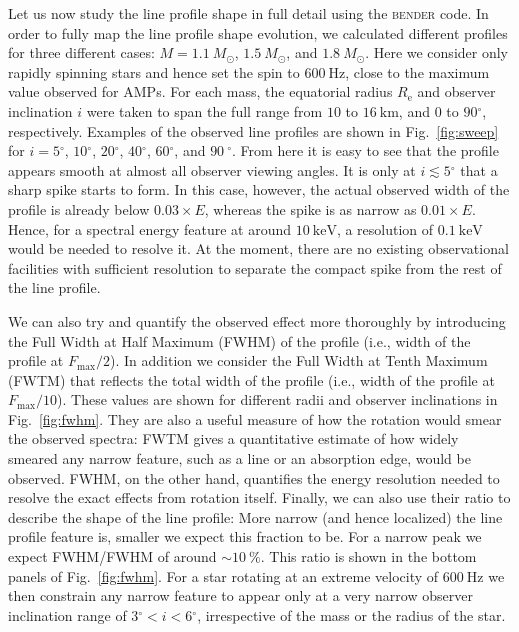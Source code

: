 \documentclass{aa}
\newcommand{\Msun}{\ensuremath{M_{\odot}}}
\renewcommand{\deg}{\ensuremath{^{\circ}}}
\begin{document}
Let us now study the line profile shape in full detail using the \textsc{bender} code.
In order to fully map the line profile shape evolution, we calculated different profiles for three different cases: $M=1.1~\Msun$, $1.5~\Msun$, and $1.8~\Msun$.
Here we consider only rapidly spinning stars and hence set the spin to $600~\mathrm{Hz}$, close to the maximum value observed for AMPs.
For each mass, the equatorial radius $R_{\mathrm{e}}$ and observer inclination $i$ were taken to span the full range from $10$ to $16~\mathrm{km}$, and $0$ to $90\deg$, respectively.
Examples of the observed line profiles are shown in Fig.~\ref{fig:sweep} for $i=5\deg$, $10\deg$, $20\deg$, $40\deg$, $60\deg$, and $90~\deg$.
From here it is easy to see that the profile appears smooth at almost all observer viewing angles.
It is only at $i \lesssim 5\deg$ that a sharp spike starts to form.
In this case, however, the actual observed width of the profile is already below $0.03 \times E$, whereas the spike is as narrow as $0.01 \times E$.
Hence, for a spectral energy feature at around $10~\mathrm{keV}$, a resolution of $0.1~\mathrm{keV}$ would be needed to resolve it.
At the moment, there are no existing observational facilities with sufficient resolution to separate the compact spike from the rest of the line profile.

We can also try and quantify the observed effect more thoroughly by introducing the Full Width at Half Maximum (FWHM) of the profile (i.e., width of the profile at $F_{\mathrm{max}}/2$).
In addition we consider the Full Width at Tenth Maximum (FWTM) that reflects the total width of the profile (i.e., width of the profile at $F_{\mathrm{max}}/10$).
These values are shown for different radii and observer inclinations in Fig.~\ref{fig:fwhm}.
They are also a useful measure of how the rotation would smear the observed spectra:
FWTM gives a quantitative estimate of how widely smeared any narrow feature, such as a line or an absorption edge, would be observed.
FWHM, on the other hand, quantifies the energy resolution needed to resolve the exact effects from rotation itself.
Finally, we can also use their ratio to describe the shape of the line profile:
More narrow (and hence localized) the line profile feature is, smaller we expect this fraction to be.
For a narrow peak we expect FWHM/FWHM of around $\sim 10~\%$.
This ratio is shown in the bottom panels of Fig.~\ref{fig:fwhm}.
For a star rotating at an extreme velocity of $600~\mathrm{Hz}$ we then constrain any narrow feature to appear only at a very narrow observer inclination range of $3\deg < i < 6\deg$, irrespective of the mass or the radius of the star.
\end{document}
